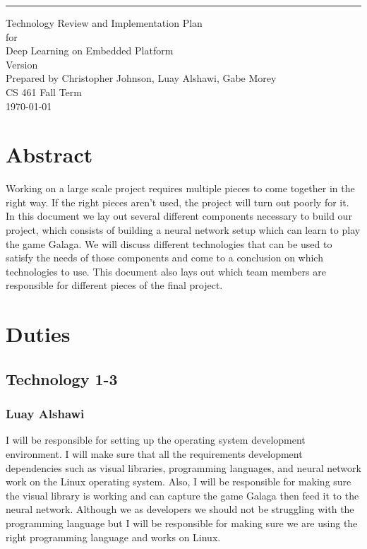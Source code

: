 \usepackage{hyperref}


\begin{flushright}
    \rule{16cm}{5pt}\vskip1cm
    \begin{bfseries}
        \Huge{Technology Review and Implementation Plan}\\
        \vspace{1.9cm}
        for\\
        \vspace{1.9cm}
        Deep Learning on Embedded Platform\\
        \vspace{1.9cm}
        \LARGE{Version \myversion}\\
        \vspace{1.9cm}
        Prepared by Christopher Johnson, Luay Alshawi, Gabe Morey\\
        \vspace{1.9cm}
        CS 461 Fall Term\\
        \vspace{1.9cm}
        \today\\
    \end{bfseries}
\end{flushright}


\chapter{Abstract}
Working on a large scale project requires multiple pieces to come together in the right way. If the right pieces aren’t used,
the project will turn out poorly for it. In this document we lay out several different components necessary to build our project,
which consists of building a neural network setup which can learn to play the game Galaga.
We will discuss different technologies that can be used to satisfy the needs of those components and come to a conclusion on which technologies to use.
 This document also lays out which team members are responsible for different pieces of the final project.

\chapter{Duties}
\section{Technology 1-3}

\subsection{Luay Alshawi}
I will be responsible for setting up the operating system development environment.
I will make sure that all the requirements development dependencies such as visual libraries, programming languages, and neural network work on the Linux operating system.
Also, I will be responsible for making sure the visual library is working and can capture the game Galaga then feed it to the neural network.
Although we as developers we should not be struggling with the programming language but I will be responsible for making sure we are using the right programming language and works on Linux.

